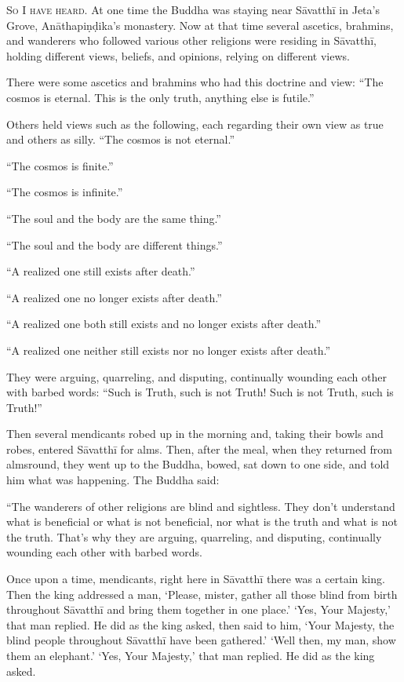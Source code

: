 \documentclass[12pt,openany]{book}%
\newcommand*{\scevam}[1]{\textsc{#1}}
\begin{document}
\scevam{So I have heard. }At one time the Buddha was staying near \textsanskrit{Sāvatthī} in Jeta’s Grove, \textsanskrit{Anāthapiṇḍika}’s monastery. Now at that time several ascetics, brahmins, and wanderers who followed various other religions were residing in \textsanskrit{Sāvatthī}, holding different views, beliefs, and opinions, relying on different views. 

There were some ascetics and brahmins who had this doctrine and view: “The cosmos is eternal. This is the only truth, anything else is futile.” 

Others held views such as the following, each regarding their own view as true and others as silly. “The cosmos is not eternal.” 

“The cosmos is finite.” 

“The cosmos is infinite.” 

“The soul and the body are the same thing.” 

“The soul and the body are different things.” 

“A realized one still exists after death.” 

“A realized one no longer exists after death.” 

“A realized one both still exists and no longer exists after death.” 

“A realized one neither still exists nor no longer exists after death.” 

They were arguing, quarreling, and disputing, continually wounding each other with barbed words: “Such is Truth, such is not Truth! Such is not Truth, such is Truth!” 

Then several mendicants robed up in the morning and, taking their bowls and robes, entered \textsanskrit{Sāvatthī} for alms. Then, after the meal, when they returned from almsround, they went up to the Buddha, bowed, sat down to one side, and told him what was happening. The Buddha said: 

“The wanderers of other religions are blind and sightless. They don't understand what is beneficial or what is not beneficial, nor what is the truth and what is not the truth. That’s why they are arguing, quarreling, and disputing, continually wounding each other with barbed words. 

Once upon a time, mendicants, right here in \textsanskrit{Sāvatthī} there was a certain king. Then the king addressed a man, ‘Please, mister, gather all those blind from birth throughout \textsanskrit{Sāvatthī} and bring them together in one place.’ ‘Yes, Your Majesty,’ that man replied. He did as the king asked, then said to him, ‘Your Majesty, the blind people throughout \textsanskrit{Sāvatthī} have been gathered.’ ‘Well then, my man, show them an elephant.’ ‘Yes, Your Majesty,’ that man replied. He did as the king asked. 
\end{document}
